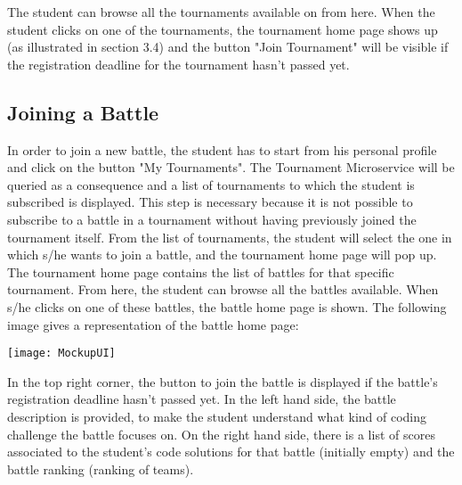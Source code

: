 The student can browse all the tournaments available on \app from here. When the student clicks on one of the tournaments, the tournament home page shows up (as illustrated in section 3.4) and the button "Join Tournament" will be visible if the registration deadline for the tournament hasn't passed yet.


\begin{minipage}{\linewidth}
\subsection{Joining a Battle}
In order to join a new battle, the student has to start from his personal profile and click on the button "My Tournaments". The Tournament Microservice will be queried as a consequence and a list of tournaments to which the student is subscribed is displayed. This step is necessary because it is not possible to subscribe to a battle in a tournament without having previously joined the tournament itself.
From the list of tournaments, the student will select the one in which s/he wants to join a battle, and the tournament home page will pop up. The tournament home page contains the list of battles for that specific tournament. From here, the student can browse all the battles available. When s/he clicks on one of these battles, the battle home page is shown.
The following image gives a representation of the battle home page:

\begin{center}
	\texttt{[image: MockupUI]}
\end{center}

\end{minipage}

In the top right corner, the button to join the battle is displayed if the battle's registration deadline hasn't passed yet. 
In the left hand side, the battle description is provided, to make the student understand what kind of coding challenge the battle focuses on. On the right hand side, there is a list of scores associated to the student's code solutions for that battle (initially empty) and the battle ranking (ranking of teams).
